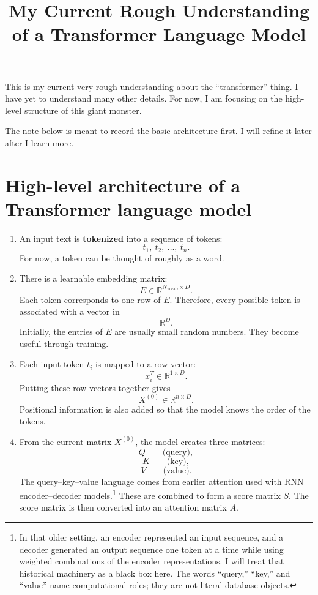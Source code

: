\documentclass[11pt]{article}
\title{My Current Rough Understanding of a Transformer Language Model}
\author{}
\date{}
\begin{document}
\maketitle

This is my current very rough understanding about the ``transformer'' thing.
I have yet to understand many other details. For now, I am focusing on the
high-level structure of this giant monster.

The note below is meant to record the basic architecture first. I will refine
it later after I learn more.

\section*{High-level architecture of a Transformer language model}

\begin{enumerate}[leftmargin=*, label=\textbf{\arabic*.}]

\item An input text is \textbf{tokenized} into a sequence of tokens:
\[
  t_1,\ t_2,\ \ldots,\ t_n.
\]
For now, a token can be thought of roughly as a word.

\item There is a learnable embedding matrix:
\[
  E \in \mathbb{R}^{N_{\mathrm{vocab}} \times D}.
\]
Each token corresponds to one row of \(E\). Therefore, every possible token is
associated with a vector in
\[
  \mathbb{R}^{D}.
\]
Initially, the entries of \(E\) are usually small random numbers. They become
useful through training.

\item Each input token \(t_i\) is mapped to a row vector:
\[
  x_i^T \in \mathbb{R}^{1 \times D}.
\]
Putting these row vectors together gives
\[
  X^{(0)} \in \mathbb{R}^{n \times D}.
\]
Positional information is also added so that the model knows the order of the
tokens.

\item From the current matrix \(X^{(0)}\), the model creates three matrices:
\[
  Q \qquad \text{(query)},
\]
\[
  K \qquad \text{(key)},
\]
\[
  V \qquad \text{(value)}.
\]
The query--key--value language comes from earlier attention used with RNN
encoder--decoder models.\footnote{In that older setting, an encoder represented
an input sequence, and a decoder generated an output sequence one token at a
time while using weighted combinations of the encoder representations. I will
treat that historical machinery as a black box here. The words ``query,''
``key,'' and ``value'' name computational roles; they are not literal database
objects.}
These are combined to form a score matrix \(S\). The score matrix is then
converted into an attention matrix \(A\).


\end{enumerate}
\end{document}
